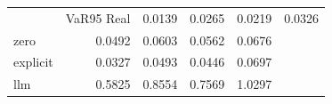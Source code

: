 \begin{tabular}{lrrrr}
\toprule
 & VaR95%
\midrule
Real & 0.0139 & 0.0265 & 0.0219 & 0.0326 \\
zero & 0.0492 & 0.0603 & 0.0562 & 0.0676 \\
explicit & 0.0327 & 0.0493 & 0.0446 & 0.0697 \\
llm & 0.5825 & 0.8554 & 0.7569 & 1.0297 \\
\bottomrule
\end{tabular}
